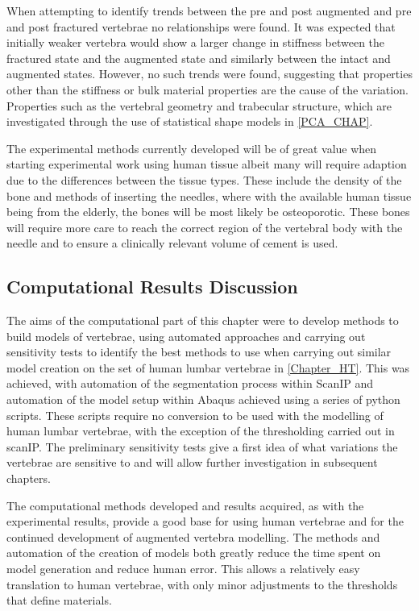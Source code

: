 When attempting to identify trends between the pre and post augmented and pre
and post fractured vertebrae no relationships were found.  It was expected that
initially weaker vertebra would show a larger change in stiffness between the
fractured state and the augmented state and similarly between the intact and
augmented states.  However, no such trends were found, suggesting that
properties other than the stiffness or bulk material properties are the cause
of the variation.  Properties such as the vertebral geometry and trabecular
structure, which are investigated through the use of statistical shape models
in \cref{PCA_CHAP}.

The experimental methods currently developed will be of great value when
starting experimental work using human tissue albeit many will require adaption
due to the differences between the tissue types.  These include the density of
the bone and methods of inserting the needles, where with the available human
tissue being from the elderly, the bones will be most likely be osteoporotic.
These bones will require more care to reach the correct region of the vertebral
body with the needle and to ensure a clinically relevant volume of cement is
used.



\subsection{Computational Results Discussion}

The aims of the computational part of this chapter were to develop methods to
build models of vertebrae, using automated approaches and carrying out
sensitivity tests to identify the best methods to use when carrying out similar
model creation on the set of human lumbar vertebrae in \cref{Chapter_HT}. This
was achieved, with automation of the segmentation process within ScanIP and
automation of the model setup within Abaqus achieved using a series of python
scripts. These scripts require no conversion to be used with the modelling of
human lumbar vertebrae, with the exception of the thresholding carried out in
scanIP. The preliminary sensitivity tests give a first idea of what variations
the vertebrae are sensitive to and will allow further investigation in
subsequent chapters.


The computational methods developed and results acquired, as with the
experimental results, provide a good base for using human vertebrae and for the
continued development of augmented vertebra modelling. The methods and
automation of the creation of models both greatly reduce the time spent on
model generation and reduce human error. This allows a relatively easy
translation to human vertebrae, with only minor adjustments to the thresholds
that define materials.

